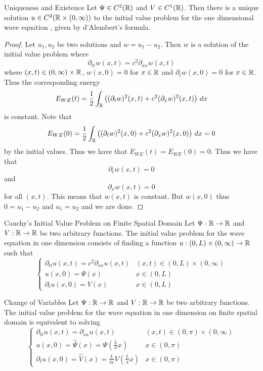 \documentclass[a4paper]{article}
\begin{document}
\begin{thm}{Uniqueness and Existence}{} Let $\Psi\in C^2(\mathbb{R})$ and $V\in C^1(\mathbb{R})$. Then there is a unique solution $u\in C^2(\mathbb{R}\times(0,\infty))$ to the initial value problem for the one dimensional wave equation , given by d'Alembert's formula. \tcbline
\begin{proof}
Let $u_1,u_2$ be two solutions and $w=u_1-u_2$. Then $w$ is a solution of the initial value problem where $$\partial_{tt}w(x,t)=c^2\partial_{xx}w(x,t)$$ where $(x,t)\in(0,\infty)\times\mathbb{R}$, $w(x,0)=0$ for $x\in\mathbb{R}$ and $\partial_tw(x,0)=0$ for $x\in\mathbb{R}$. Thus the corresponding energy $$E_{WE}(t)=\frac{1}{2}\int_{\mathbb{R}}\left((\partial_tw)^2(x,t)+c^2(\partial_xw)^2(x,t)\right)\,dx$$ is constant. Note that $$E_{WE}(0)=\frac{1}{2}\int_{\mathbb{R}}\left((\partial_tw)^2(x,0)+c^2(\partial_xw)^2(x,0)\right)\,dx=0$$ by the initial values. Thus we have that $E_{WE}(t)=E_{WE}(0)=0$. Thus we have that $$\partial_tw(x,t)=0$$ and $$\partial_xw(x,t)=0$$ for all $(x,t)$. This means that $w(x,t)$ is constant. But $w(x,0)$ thus $0=u_1-u_2$ and $u_1=u_2$ and we are done. 
\end{proof}
\end{thm}

\begin{defn}{Cauchy's Initial Value Problem on Finite Spatial Domain}{} Let $\Psi:\mathbb{R}\to\mathbb{R}$ and $V:\mathbb{R}\to\mathbb{R}$ be two arbitrary functions. The initial value problem for the wave equation in one dimension consists of finding a function $u:(0,L)\times(0,\infty)\to\mathbb{R}$ such that
$$\begin{cases}
\partial_{tt}u(x,t)=c^2\partial_{xx}u(x,t) & (x,t)\in(0,L)\times(0,\infty)\\
u(x,0)=\Psi(x) & x\in(0,L)\\
\partial_tu(x,0)=V(x) & x\in(0,L)
\end{cases}$$
\end{defn}

\begin{prp}{Change of Variables}{} Let $\Psi:\mathbb{R}\to\mathbb{R}$ and $V:\mathbb{R}\to\mathbb{R}$ be two arbitrary functions. The initial value problem for the wave equation in one dimension on finite spatial domain is equivalent to solving $$\begin{cases}
\partial_{tt}u(x,t)=\partial_{xx}u(x,t) & (x,t)\in(0,\pi)\times(0,\infty)\\
u(x,0)=\hat{\Psi}(x)=\Psi\left(\frac{L}{\pi}x\right) & x\in(0,\pi)\\
\partial_tu(x,0)=\hat{V}(x)=\frac{L}{\pi c}V\left(\frac{L}{\pi}x\right) & x\in(0,\pi)
\end{cases}$$ 
\end{prp}
\end{document}
